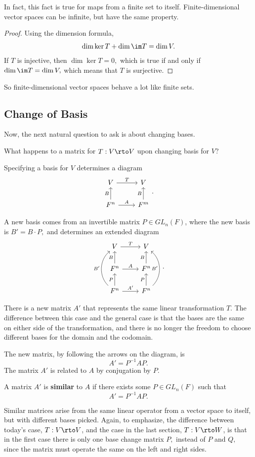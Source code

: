 In fact, this fact is true for maps from a finite set to itself. Finite-dimensional vector spaces can be infinite, but have the same property.

\begin{proof}
Using the dimension formula, 
\[\dim \ker T + \dim \im T = \dim V.\] If $T$ is injective, then $\dim\ker T = 0,$ which is true if and only if $\dim\im T = \dim V,$ which means that $T$ is surjective. 
\end{proof}

So finite-dimensional vector spaces behave a lot like finite sets. 

\subsection{Change of Basis}

Now, the next natural question to ask is about changing bases. 
\begin{qq}
What happens to a matrix for $T: V \rto V$ upon changing basis for $V$?
\end{qq}

Specifying a basis for $V$ determines a diagram  \[
\begin{tikzcd}
V \arrow[r, "T"] & V \\
F^n \arrow[u, "B"]\arrow[r, "A"] & F^m \arrow[u, "B"]
\end{tikzcd}.
\]

A new basis comes from an invertible matrix $P \in GL_n(F)$, where the new basis is $B' = B \cdot P,$ and determines an extended diagram 
\[\begin{tikzcd}
V \arrow[r, "T"] & V \\
F^n \arrow[u, "B"]\arrow[r, "A"] & F^n \arrow[u, "B"] \\
F^n \arrow[u, "P"] \arrow[uu, bend left=49, "B'"] \arrow[r, "A'"] & F^n \arrow[u, "P"] \arrow[uu, bend right=49, "B'"]
\end{tikzcd}.
\]

There is a new matrix $A'$ that represents the same linear transformation $T.$ The difference between this case and the general case is that the bases are the same on either side of the transformation, and there is no longer the freedom to choose different bases for the domain and the codomain. 

The new matrix, by following the arrows on the diagram, is \[A' = P^{-1}AP.\] The matrix $A'$ is related to $A$ by conjugation by $P.$ 

\begin{definition}
A matrix $A'$ is \textbf{similar} to $A$ if there exists some $P \in GL_n(F)$ such that \[A' = P^{-1}AP.\]
\end{definition}
Similar matrices arise from the same linear operator from a vector space to itself, but with different bases picked. Again, to emphasize, the difference between today's case, $T: V \rto V$, and the case in the last section, $T: V \rto W$, is that in the first case there is only one base change matrix $P,$ instead of $P$ and $Q,$ since the matrix must operate the same on the left and right sides.


